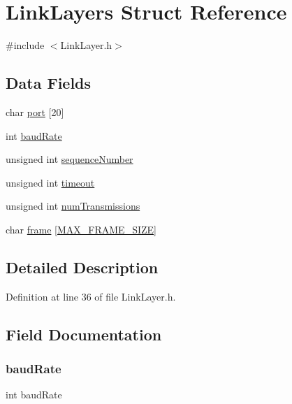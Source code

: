 \hypertarget{struct_link_layers}{}\section{Link\+Layers Struct Reference}
\label{struct_link_layers}


{\ttfamily \#include $<$Link\+Layer.\+h$>$}

\subsection*{Data Fields}
\begin{DoxyCompactItemize}
\item 
char \hyperlink{struct_link_layers_a1bf41122fd2e6f904119473794d4f52b}{port} \mbox{[}20\mbox{]}
\item 
int \hyperlink{struct_link_layers_a352a05efbed742a2c47e738725ee5613}{baud\+Rate}
\item 
unsigned int \hyperlink{struct_link_layers_ab7bd0cb3cdcb24d52a0a5ead5be21baa}{sequence\+Number}
\item 
unsigned int \hyperlink{struct_link_layers_a25af7eefd48048fb067a60b8e295caf1}{timeout}
\item 
unsigned int \hyperlink{struct_link_layers_ac032302ea4696263706fe7dd32e6e4bc}{num\+Transmissions}
\item 
char \hyperlink{struct_link_layers_af14a4ec6e090d2d3d7439ca5d3fd60e4}{frame} \mbox{[}\hyperlink{_link_layer_8h_ad15d35a0d29a9dbf9324e3859ce3b008}{M\+A\+X\+\_\+\+F\+R\+A\+M\+E\+\_\+\+S\+I\+ZE}\mbox{]}
\end{DoxyCompactItemize}


\subsection{Detailed Description}


Definition at line 36 of file Link\+Layer.\+h.



\subsection{Field Documentation}
\hypertarget{struct_link_layers_a352a05efbed742a2c47e738725ee5613}{}\label{struct_link_layers_a352a05efbed742a2c47e738725ee5613} 
\subsubsection{\texorpdfstring{baud\+Rate}{baudRate}}
{\footnotesize\ttfamily int baud\+Rate}



